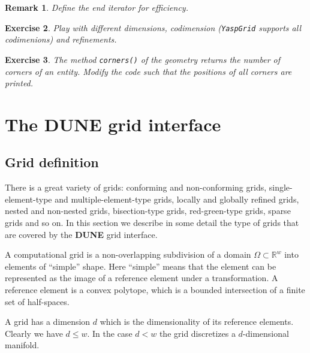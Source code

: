 \documentclass[11pt,a4paper,headinclude,footinclude,DIV16,headings=normal]{scrreprt}
\newcommand{\R}{\mathbb{R}}
\newcommand{\Dune}{{\sffamily\bfseries DUNE}\xspace}
\newtheorem{exc}{Exercise}[chapter]
\newtheorem{rem}[exc]{Remark}
\begin{document}
\begin{rem} Define the end iterator for efficiency.
\end{rem}

\begin{exc} Play with different dimensions, codimension
  (\lstinline!YaspGrid! supports all codimenions) and refinements.
\end{exc}

\begin{exc} The method \lstinline!corners()! of the geometry returns
  the number of corners of an entity. Modify the code such that the
  positions of all corners are printed.
\end{exc}


\chapter{The \texorpdfstring{\Dune{}}{DUNE} grid interface}


\section{Grid definition}

There is a great variety of grids: conforming and non-conforming
grids, single-element-type and multiple-element-type grids, locally
and globally refined grids, nested and non-nested grids,
bisection-type grids, red-green-type grids, sparse grids and so on. In
this section we describe in some detail the type of grids that are
covered by the \Dune{} grid interface.


A computational grid is a non-overlapping subdivision of a domain
$\Omega\subset\R^w$ into elements of ``simple'' shape. Here ``simple''
means that the element can be represented as the image of a reference
element under a transformation. A reference element is a convex
polytope, which is a bounded intersection of a finite set of
half-spaces.


A grid has a dimension $d$ which is the dimensionality of
its reference elements. Clearly we have $d\leq w$. In the case $d<w$ the grid
discretizes a $d$-dimensional manifold.
\end{document}
